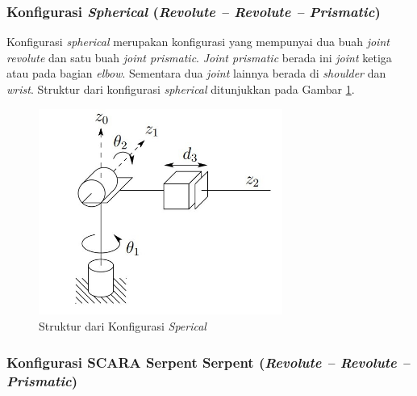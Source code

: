 \subsubsection{Konfigurasi \textit{Spherical} (\textit{Revolute – Revolute – Prismatic})} 

Konfigurasi \textit{spherical} merupakan konfigurasi yang mempunyai dua buah \textit{joint revolute} dan satu buah \textit{joint prismatic}. \textit{Joint prismatic} berada ini \textit{joint} ketiga atau pada bagian \textit{elbow}. Sementara dua \textit{joint} lainnya berada di \textit{shoulder} dan \textit{wrist}. Struktur dari konfigurasi \textit{spherical} ditunjukkan pada Gambar \ref{pic.spherical}. 
\begin{figure}[H]
	\centering
	\includegraphics[width=8cm]{gambar/spherical.jpg}
	\caption{Struktur dari Konfigurasi \textit{Sperical}\cite{Spong2006}}
	\label{pic.spherical}
\end{figure}


\subsubsection{Konfigurasi SCARA Serpent Serpent (\textit{Revolute – Revolute – Prismatic}) } 

